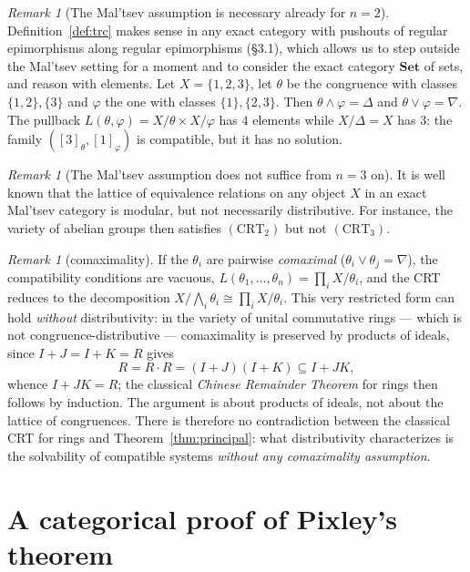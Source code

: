 \documentclass[11pt,a4paper]{article}
\theoremstyle{plain}
\theoremstyle{definition}
\theoremstyle{remark}
\newtheorem{remarque}[theoreme]{Remark}
\theoremstyle{plain}
\newcommand{\Set}{\mathbf{Set}}
\begin{document}
\begin{remarque}[The Mal'tsev assumption is necessary already for $n=2$]
\label{ex:set}
Definition~\ref{def:trc} makes sense in any exact category with pushouts
of regular epimorphisms along regular epimorphisms (\S 3.1), which allows
us to step outside the Mal'tsev
setting for a moment and to consider the exact category $\Set$ of sets, and reason
with elements. Let $X = \{1,2,3\}$, let $\theta$ be the congruence
with classes $\{1,2\},\{3\}$ and $\varphi$ the one with classes
$\{1\},\{2,3\}$. Then $\theta \wedge \varphi = \Delta$ and
$\theta \vee \varphi = \nabla$. The pullback $L(\theta,\varphi) =
X/\theta \times X/\varphi$ has $4$ elements while $X/\Delta = X$ has $3$:
the family $([3]_\theta, [1]_\varphi)$ is  compatible, but it has no
solution.
\end{remarque}

\begin{remarque}[The Mal'tsev assumption does not suffice from $n=3$ on]\label{ex:m3}
It is well known that the lattice of equivalence relations on any object $X$ in an exact Mal'tsev category is modular, but not necessarily distributive. 
For instance, the variety of abelian groups 
then satisfies $(\mathrm{CRT}_2)$ but not $(\mathrm{CRT}_3)$.
\end{remarque}

\begin{remarque}[comaximality]
If the $\theta_i$ are pairwise \emph{comaximal}
($\theta_i \vee \theta_j = \nabla$), the compatibility conditions are
vacuous, $L(\theta_1,\dots,\theta_n) = \prod_i X/\theta_i$, and the CRT
reduces to the decomposition
$X/\bigwedge_i \theta_i \cong \prod_i X/\theta_i$. This very restricted form can
hold \emph{without} distributivity: in the variety of unital commutative rings --- which
is not congruence-distributive --- comaximality is preserved by products of ideals,
since $I + J = I + K = R$ gives
\[
R = R \cdot R = (I+J)(I+K) \subseteq I + JK ,
\]
whence $I + JK = R$; the classical \emph{Chinese Remainder Theorem} for rings
then follows by induction. The argument is about products of ideals, not
about the lattice of congruences. There is therefore no contradiction
between the classical CRT for rings and Theorem~\ref{thm:principal}: what
distributivity characterizes is the solvability of compatible systems
\emph{without any comaximality assumption}.
\end{remarque}


\section{A categorical proof of Pixley's theorem}\label{sec:pixley}
\end{document}
